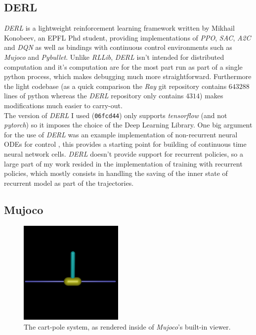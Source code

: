 \subsection{DERL}

\textit{DERL} \cite{konobeev2018} is a lightweight reinforcement learning framework written by Mikhail Konobeev, an EPFL Phd student, providing implementations of \textit{PPO}, \textit{SAC}, \textit{A2C} and \textit{DQN} as well as bindings with continuous control environments such as \textit{Mujoco} and \textit{Pybullet}. Unlike \textit{RLLib}, \textit{DERL} isn't intended for distributed computation and it's computation are for the most part run as part of a single python process, which makes debugging much more straightforward. Furthermore the light codebase (as a quick comparison the \textit{Ray} git repository contains $643288$ lines of python whereas the \textit{DERL} repository only contains $4314$) makes modifications much easier to carry-out. \\

The version of \textit{DERL} I used (\texttt{06fcd44}) only supports \textit{tensorflow} (and not \textit{pytorch}) so it imposes the choice of the Deep Learning Library. One big argument for the use of \textit{DERL} was an example implementation of non-recurrent neural ODEs for control \cite{konobeev2018}, this provides a starting point for building of continuous time neural network cells. \textit{DERL} doesn't provide support for recurrent policies, so a large part of my work resided in the implementation of training with recurrent policies, which mostly consists in handling the saving of the inner state of recurrent model as part of the trajectories. 

\subsection{Mujoco}

\begin{figure}[h!]
    \centering
    \includegraphics[width=0.45\textwidth]{figures/mujoco_cartpole.png}
    \caption{The cart-pole system, as rendered inside of \textit{Mujoco}'s built-in viewer.}
\end{figure}


